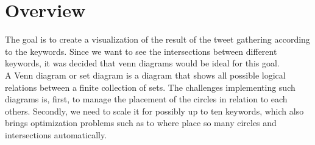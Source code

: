 \section{Overview}
The goal is to create a visualization of the result of the tweet gathering according to the keywords. Since we want to see the intersections between different keywords, it was decided that venn diagrams would be ideal for this goal.\\
A Venn diagram or set diagram is a diagram that shows all possible logical relations between a finite collection of sets. The challenges implementing such diagrams is, first, to manage the placement of the circles in relation to each others. Secondly, we need to scale it for possibly up to ten keywords, which also brings optimization problems such as to where place so many circles and intersections automatically.\\